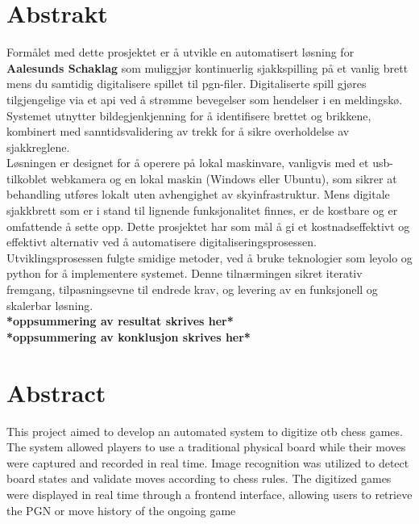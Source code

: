 \chapter*{Abstrakt}

Formålet med dette prosjektet er å utvikle en automatisert løsning for \textbf{Aalesunds Schaklag} som muliggjør kontinuerlig sjakkspilling på et vanlig brett mens du samtidig digitalisere spillet til \gls{pgn}-filer. Digitaliserte spill gjøres tilgjengelige via et \gls{api} ved å strømme bevegelser som hendelser i en meldingskø. Systemet utnytter bildegjenkjenning for å identifisere brettet og brikkene, kombinert med sanntidsvalidering av trekk for å sikre overholdelse av sjakkreglene. \\

Løsningen er designet for å operere på lokal maskinvare, vanligvis med et \acrshort{usb}-tilkoblet webkamera og en lokal maskin (Windows eller Ubuntu), som sikrer at behandling utføres lokalt uten avhengighet av skyinfrastruktur. Mens digitale sjakkbrett som er i stand til lignende funksjonalitet finnes, er de kostbare og er omfattende å sette opp. Dette prosjektet har som mål å gi et kostnadseffektivt og effektivt alternativ ved å automatisere digitaliseringsprosessen. \\

Utviklingsprosessen fulgte smidige metoder, ved å bruke teknologier som \gls{leyolo} og \gls{python} for å implementere systemet. Denne tilnærmingen sikret iterativ fremgang, tilpasningsevne til endrede krav, og levering av en funksjonell og skalerbar løsning. \\

\textbf{*oppsummering av resultat skrives her*}\\

\textbf{*oppsummering av konklusjon skrives her*}


\newpage


\chapter*{Abstract}
This project aimed to develop an automated system to digitize \gls{otb} chess games. The system allowed players to use a traditional physical board while their moves were captured and recorded in real time. Image recognition was utilized to detect board states and validate moves according to chess rules. 
The digitized games were displayed in real time through a frontend interface, allowing users to retrieve the PGN or move history of the ongoing game


